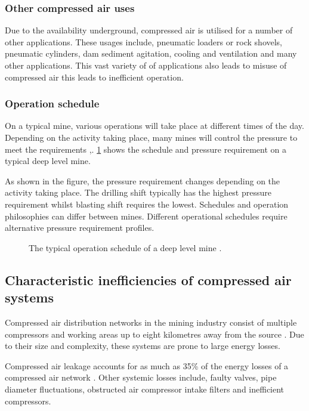 			\subsubsection{Other compressed air uses}
			 	 Due to the availability underground, compressed air is utilised for a number of other applications. These usages include, pneumatic loaders or rock shovels, pneumatic cylinders, dam sediment agitation, cooling and ventilation and many other applications. This vast variety of of applications also leads to misuse of compressed air this leads to inefficient operation.
			\subsubsection{Operation schedule}
				On a typical mine, various operations will take place at different times of the day. Depending on the activity taking place, many mines will control the pressure to meet the requirements \cite{Kriel2014Masters},\cite{Marais2012PhD}. \cref{fig: Mining schedule} shows the schedule and pressure requirement on a typical deep level mine.\par 
				As shown in the figure, the pressure requirement changes depending on the activity taking place. The drilling shift typically has the highest pressure requirement whilst blasting shift requires the lowest. Schedules and operation philosophies can differ between mines. Different operational schedules require alternative pressure requirement profiles.
				\begin{figure}[h]
					\centering
					\fbox{}
					\caption[A typical operation schedule of a deep level mine.]{The typical operation schedule of a deep level mine \cite{Kriel2014Masters}.}
					\label{fig: Mining schedule}
				\end{figure}
	\subsection{Characteristic inefficiencies of compressed air systems}
		Compressed air distribution networks in the mining industry consist of multiple compressors and working areas up to eight kilometres away from the source \cite{Marais2012PhD}. Due to their size and complexity, these systems are prone to large energy losses.
		\par 
		Compressed air leakage accounts for as much as 35\% of the energy losses of a compressed air network \cite{Lawrence2004Improving}. Other systemic losses include, faulty valves, pipe diameter fluctuations, obstructed air compressor intake filters and inefficient compressors. 	
